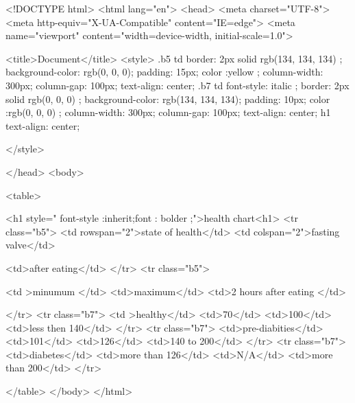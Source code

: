 <!DOCTYPE html>
<html lang="en">
<head>
    <meta charset="UTF-8">
    <meta http-equiv="X-UA-Compatible" content="IE=edge">
    <meta name="viewport" content="width=device-width, initial-scale=1.0">
  
    <title>Document</title>
    <style> .b5 td{
        border: 2px solid rgb(134, 134, 134) ;
        background-color: rgb(0, 0, 0);
        padding: 15px;
        color :yellow ;
        column-width: 300px;
        column-gap: 100px;
        text-align: center;
    }
    .b7 td{
       font-style: italic ;
        border: 2px solid rgb(0, 0, 0) ;
        background-color: rgb(134, 134, 134);
        padding: 10px;
        color :rgb(0, 0, 0) ;
        column-width: 300px;
        column-gap: 100px;
        text-align: center;
    }
    h1{
        text-align: center;
    }
      
    </style>

</head>
<body>

<table>
      
        <h1 style=" font-style :inherit;font : bolder ;">health chart<h1>
            <tr class="b5">
            <td rowspan="2">state of health</td>
            <td colspan="2">fasting valve</td>
            
            <td>after eating</td>
    </tr>
    <tr class="b5">
        
        <td >minumum </td>
        <td>maximum</td>
        <td>2 hours after eating </td>
        
    </tr>
    <tr class="b7">
        <td >healthy</td>
        <td>70</td>
        <td>100</td>
        <td>less then 140</td>
    </tr>
    <tr class="b7">
        <td>pre-diabities</td>
        <td>101</td>
        <td>126</td>
        <td>140 to 200</td>
    </tr>
    <tr class="b7">
        <td>diabetes</td>
        <td>more than 126</td>
        <td>N/A</td>
        <td>more than 200</td>
    </tr>

</table>
</body>
</html>